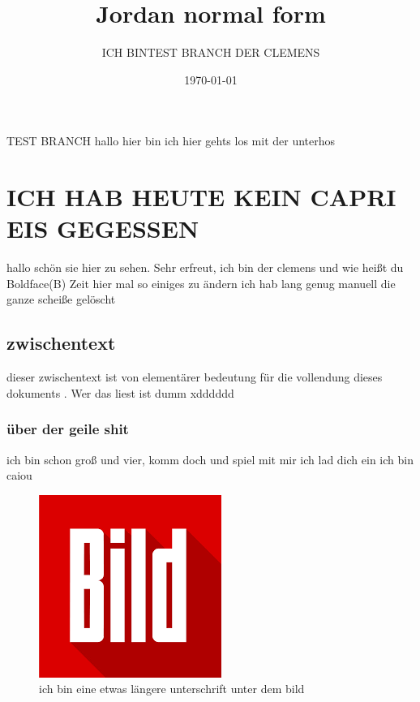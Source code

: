 \documentclass[a4paper]{scrartcl}
\title{Jordan normal form}
\author{ICH BINTEST BRANCH  DER CLEMENS}
\date{\today}
\begin{document}
	\maketitle
	\tableofcontents
	\newpage
	TEST BRANCH hallo hier bin ich
	hier gehts los mit der unterhos
		\section{ICH HAB HEUTE KEIN CAPRI EIS GEGESSEN}
			hallo schön sie hier zu sehen. Sehr erfreut, ich bin der clemens und wie heißt du
			Boldface(B)
			Zeit hier mal so einiges zu ändern ich hab lang genug manuell die ganze scheiße gelöscht
			
			\subsection{zwischentext}
			dieser zwischentext ist von elementärer bedeutung für die vollendung dieses dokuments . Wer das liest ist dumm xdddddd
				\subsubsection{über der geile shit}
				ich bin schon groß und vier, komm doch und spiel mit mir ich lad dich ein ich bin\label{eins} caiou \vspace{40pt}
				
				\begin{figure}[h]
					\centering
					\includegraphics[width=0.7\linewidth]{download.png}
					\caption[ich bin eine sehr kurze unterschrift von dem bild]{ich bin eine etwas längere unterschrift unter dem bild}
					\label{fig:wallpaper}
				\end{figure}
				\pagebreak
				
\end{document}
